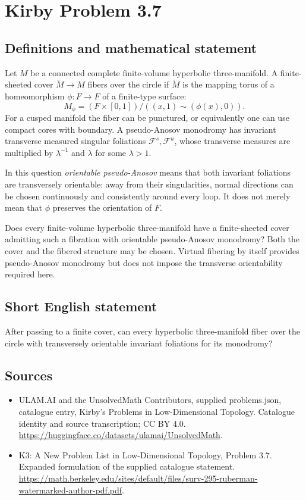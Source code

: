 \documentclass[11pt,a4paper]{article}
\begin{document}
\section*{Kirby Problem 3.7}\label{statement}

\subsection{Definitions and mathematical statement}
Let $M$ be a connected complete finite-volume hyperbolic three-manifold.
A finite-sheeted cover $\widetilde M\to M$ fibers over the circle if
$\widetilde M$ is the mapping torus of a homeomorphism
$\phi:F\to F$ of a finite-type surface:
\[
 M_\phi=(F\times[0,1])/((x,1)\sim(\phi(x),0)).
\]
For a cusped manifold the fiber can be punctured, or equivalently one can
use compact cores with boundary. A pseudo-Anosov monodromy has invariant
transverse measured singular foliations $\mathcal F^s,\mathcal F^u$, whose
transverse measures are multiplied by $\lambda^{-1}$ and $\lambda$ for
some $\lambda>1$.

In this question \emph{orientable pseudo-Anosov} means that both invariant
foliations are transversely orientable: away from their singularities, normal
directions can be chosen continuously and consistently around every loop.
It does not merely mean that $\phi$ preserves the orientation of $F$.

Does every finite-volume hyperbolic three-manifold have a finite-sheeted
cover admitting such a fibration with orientable pseudo-Anosov monodromy?
Both the cover and the fibered structure may be chosen. Virtual fibering by
itself provides pseudo-Anosov monodromy but does not impose the transverse
orientability required here.
\subsection{Short English statement}
After passing to a finite cover, can every hyperbolic three-manifold fiber over the circle with transversely orientable invariant foliations for its monodromy?
\subsection{Sources}
\begin{itemize}
\item[S1] ULAM.AI and the UnsolvedMath Contributors, supplied problems.json, catalogue entry, Kirby's Problems in Low-Dimensional Topology. Catalogue identity and source transcription; CC BY 4.0.
\url{https://huggingface.co/datasets/ulamai/UnsolvedMath}.
\item[S2] K3: A New Problem List in Low-Dimensional Topology, Problem 3.7. Expanded formulation of the supplied catalogue statement.
\url{https://math.berkeley.edu/sites/default/files/surv-295-ruberman-watermarked-author-pdf.pdf}.
\end{itemize}
\end{document}
